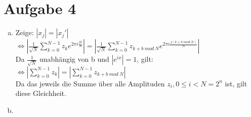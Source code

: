 \documentclass[a4paper]{scrartcl}
\begin{document}
\newpage
\section*{Aufgabe 4}
\begin{enumerate}[a)]
\item Zeige: $|x_j|=|x_j'|$\\
$\Leftrightarrow |\frac{1}{\sqrt{N}}\sum_{k=0}^{N-1}z_k e^{2\pi i \frac{jk}{N}}| = |\frac{1}{\sqrt{N}}\sum_{k=0}^{N-1}z_{k+b~mod~N} e^{2\pi i \frac{j(k+b~mod~N)}{N}}|$\\
Da $\frac{1}{\sqrt{N}}$ unabhängig von b und $|e^{ix}|=1$, gilt:\\
$\Leftrightarrow |\sum_{k=0}^{N-1}z_k| = |\sum_{k=0}^{N-1}z_{k+b~mod~N}|$\\
Da das jeweils die Summe über alle Amplituden $z_i, 0\leq i < N = 2^n$ ist, gilt diese Gleichheit.

\item
\end{enumerate}
\end{document}
